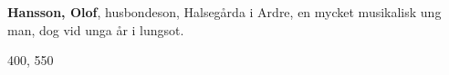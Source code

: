 \textbf{Hansson, Olof}, husbondeson, Halsegårda i Ardre, en mycket musikalisk ung man, dog vid unga år i lungsot.

400, 550 
